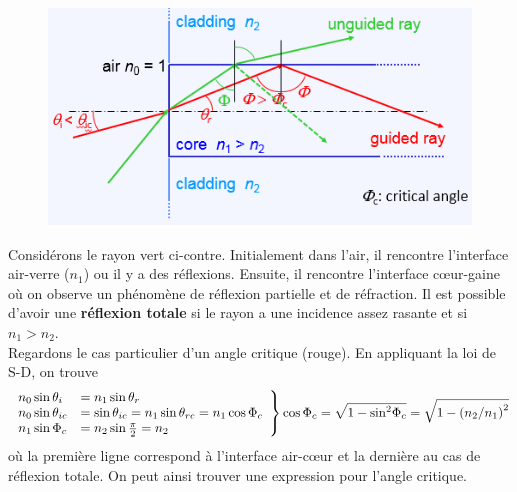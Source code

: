 	\begin{figure}
	\vspace{-9mm}
	\includegraphics[scale=0.6]{ch1/image3.png}
	\end{figure}
Considérons le rayon vert ci-contre. Initialement dans l'air, il rencontre l'interface air-verre ($
n_1$) ou il y a des réflexions. Ensuite, il rencontre l'interface cœur-gaine où on observe un 
phénomène de réflexion partielle et de réfraction. Il est possible d'avoir une \textbf{réflexion
totale} si le rayon a une incidence assez rasante et si $n_1>n_2$.\\

Regardons le cas particulier d'un angle critique (rouge). En appliquant la loi de S-D, on trouve
\begin{equation}
\left.\begin{array}{ll}
{n_0}\sin {\theta _i} &= {n_1}\sin {\theta _r}\\
{n_0}\sin {\theta _{ic}} &= \sin {\theta _{ic}} = {n_1}\sin {\theta _{rc}} = {n_1}\cos {\Phi _c}\\
{n_1}\sin {\Phi _c} &= {n_2}\sin \frac{\pi }{2} = {n_2}
\end{array}\right\}\cos {\Phi _c} = \sqrt {1 - {{\sin }^2}{\Phi _c}} = \sqrt {1 - {{\left( {{{{n_2}} \mathord{\left/
 {\vphantom {{{n_2}} {{n_1}}}} \right.
 \kern-\nulldelimiterspace} {{n_1}}}} \right)}^2}}
\end{equation}
où la première ligne correspond à l'interface air-cœur et la dernière au cas de réflexion totale. On 
peut ainsi trouver une expression pour l'angle critique. \\

\ \\

